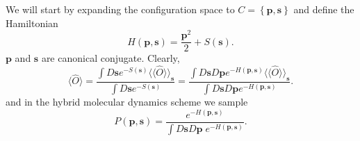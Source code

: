 We will start by expanding the configuration space to $ C = \left\{ \pmb{p}, \pmb{s}  \right\} $   and define the Hamiltonian 
\begin{equation}
  H(\pmb{p}, \pmb{s} )   = \frac{ \pmb{p}^2 }{2}  +   S(\pmb{s} ).
\end{equation}
 $\pmb{p} $  and $\pmb{s}$ are canonical conjugate.  Clearly, 
 \begin{equation}
 \langle \hat{O} \rangle   =  \frac{ \int D \pmb{s} e^{- S(\pmb{s} ) }  \langle \langle \hat{O} \rangle \rangle_{\pmb{s} } } { \int D \pmb{s} e^{- S(\pmb{s} )}}
 = \frac{ \int D \pmb{s} D \pmb{p} e^{- H(\pmb{p},\pmb{s})}  \langle \langle \hat{O} \rangle \rangle_{\pmb{s} } } { \int D \pmb{s}  D \pmb{p} e^{-H(\pmb{p},\pmb{s}) }}.
 \end{equation}
 and in the hybrid molecular dynamics scheme we sample
 \begin{equation}
 	P(\pmb{p},\pmb{s})   =   \frac{e^{-H (\pmb{p},\pmb{s})}}{ \int D \pmb{s}  D \pmb{p} \; e^{-H(\pmb{p},\pmb{s}) } }.
 \end{equation}
 
